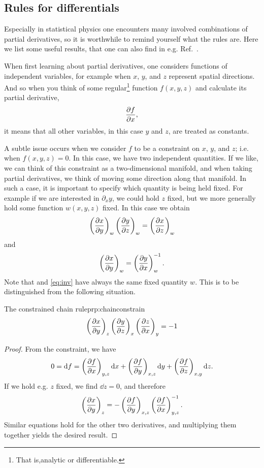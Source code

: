\subsection{Rules for differentials}

Especially in statistical physics one encounters many involved combinations
of partial derivatives, so it is worthwhile to remind yourself what the
rules are. Here we list some useful results, that one can also
find in e.g. Ref.~\cite{huang_introduction_2001}.

When first learning about partial derivatives, one considers functions
of independent variables, for example when $x$, $y$, and $z$ represent
spatial directions. And so when you think of some
regular\footnote{That is,analytic or differentiable.} 
function $f(x,y,z)$
and calculate its partial derivative,
\begin{equation}
\pdv{f}{x},
\end{equation}
it means that all other variables, in this case $y$ and $z$, are treated as
constants.


A subtle issue occurs when we consider $f$ to be a constraint on $x$, $y$,
and $z$; i.e. when $f(x,y,z)=0$. In this case, we have two independent
quantities. If we like, we can think of this constraint as a two-dimensional
manifold, and when taking partial derivatives, we think of moving some direction
along that manifold. In such a case, it is important to specify which quantity
is being held fixed. For example if we are interested in $\partial_x y$, we
could hold $z$ fixed, but we more generally hold some function
$w(x,y,z)$ fixed. In this case we obtain
\begin{equation}\label{eq:chainw}
\left(\pdv{x}{y}\right)_w
\left(\pdv{y}{z}\right)_w
=\left(\pdv{x}{z}\right)_w
\end{equation}
and
\begin{equation}\label{eq:inv}
\left(\pdv{x}{y}\right)_w
=\left(\pdv{y}{x}\right)_w^{-1}.
\end{equation}
Note that  and \eqref{eq:inv} have always the same
fixed quantity $w$. This is to be distinguished from the following
situation.

\begin{proposition}{The constrained chain rule}{prp:chainconstrain}
$$
\left(\pdv{x}{y}\right)_z
\left(\pdv{y}{z}\right)_x
\left(\pdv{z}{x}\right)_y
=-1
$$
\begin{proof}
From the constraint, we have
\begin{equation*}
0=\dd f=
 \left(\pdv{f}{x}\right)_{y,z}\dd x
+\left(\pdv{f}{y}\right)_{x,z}\dd y
+\left(\pdv{f}{z}\right)_{x,y}\dd z.
\end{equation*}
If we hold e.g. $z$ fixed, we find $\dd z=0$, and therefore
\begin{equation*}
\left(\pdv{x}{y}\right)_z=-\left(\pdv{f}{y}\right)_{x,z}\left(\pdv{f}{x}\right)_{y,z}^{-1}.
\end{equation*}
Similar equations hold for the other two derivatives, and multiplying them
together yields the desired result.
\end{proof}
\end{proposition}
                         

